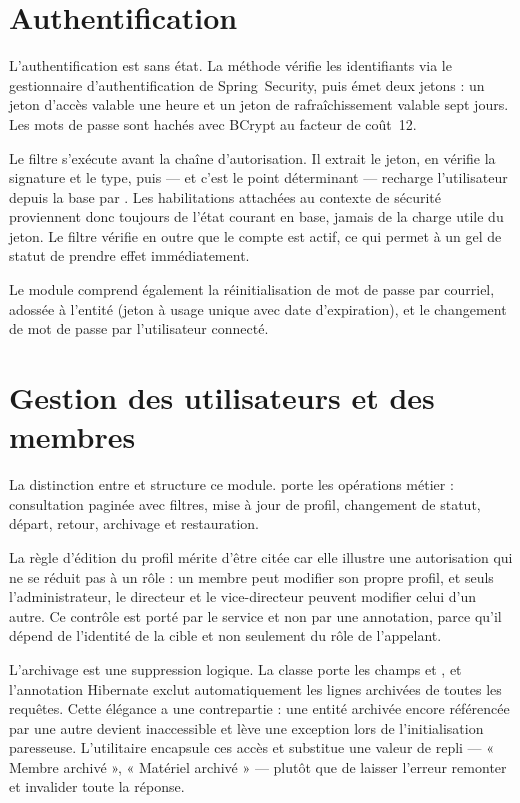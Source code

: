 \section{Authentification}

L'authentification est sans état. La méthode  vérifie les identifiants via le
gestionnaire d'authentification de Spring~Security, puis émet deux jetons : un jeton
d'accès valable une heure et un jeton de rafraîchissement valable sept jours. Les mots de
passe sont hachés avec BCrypt au facteur de coût~12.

Le filtre  s'exécute avant la chaîne d'autorisation. Il
extrait le jeton, en vérifie la signature et le type, puis --- et c'est le point
déterminant --- recharge l'utilisateur depuis la base par
. Les habilitations attachées au contexte
de sécurité proviennent donc toujours de l'état courant en base, jamais de la charge utile
du jeton. Le filtre vérifie en outre que le compte est actif, ce qui permet à un gel de
statut de prendre effet immédiatement.

Le module comprend également la réinitialisation de mot de passe par courriel, adossée à
l'entité  (jeton à usage unique avec date d'expiration), et le
changement de mot de passe par l'utilisateur connecté.

\section{Gestion des utilisateurs et des membres}

La distinction entre  et  structure ce module. 
porte les opérations métier : consultation paginée avec filtres, mise à jour de profil,
changement de statut, départ, retour, archivage et restauration.

La règle d'édition du profil mérite d'être citée car elle illustre une autorisation qui ne
se réduit pas à un rôle : un membre peut modifier son propre profil, et seuls
l'administrateur, le directeur et le vice-directeur peuvent modifier celui d'un autre. Ce
contrôle est porté par le service et non par une annotation, parce qu'il dépend de
l'identité de la cible et non seulement du rôle de l'appelant.

L'archivage est une suppression logique. La classe  porte les champs
 et , et l'annotation Hibernate
 exclut automatiquement les lignes archivées de
toutes les requêtes. Cette élégance a une contrepartie : une entité archivée encore
référencée par une autre devient inaccessible et lève une exception lors de
l'initialisation paresseuse. L'utilitaire  encapsule ces accès et
substitue une valeur de repli --- « Membre archivé », « Matériel archivé » --- plutôt que
de laisser l'erreur remonter et invalider toute la réponse.

